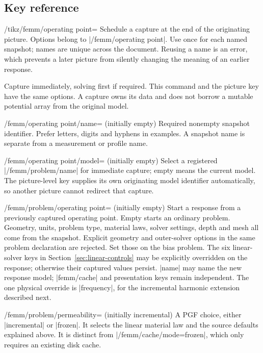 \subsection{Key reference}
\begin{key}{/tikz/femm/operating point=}
Schedule a capture at the end of the originating picture. Options belong to
|/femm/operating point|. Use once for each named snapshot; names are
unique across the document. Reusing a name is an error, which prevents a
later picture from silently changing the meaning of an earlier response.
\end{key}
\begin{command}{\femmoperatingpoint{}}
Capture immediately, solving first if required. This command and the picture
key have the same options. A capture owns its data and does not borrow a
mutable potential array from the original model.
\end{command}
\begin{key}{/femm/operating point/name= (initially empty)}
Required nonempty snapshot identifier. Prefer letters, digits and hyphens in
examples. A snapshot name is separate from a measurement or profile name.
\end{key}
\begin{key}{/femm/operating point/model= (initially empty)}
Select a registered |/femm/problem/name| for immediate capture; empty means
the current model. The picture-level key supplies its own originating model
identifier automatically, so another picture cannot redirect that capture.
\end{key}
\begin{key}{/femm/problem/operating point= (initially empty)}
Start a response from a previously captured operating point. Empty starts an
ordinary problem. Geometry, units, problem type, material laws, solver settings,
depth and mesh all come from the snapshot. Explicit geometry and outer-solver
options in the same problem declaration are rejected. Set those on the bias
problem. The six linear-solver keys in Section~\ref{sec:linear-controls} may be
explicitly overridden on the response; otherwise their captured values persist. |name| may name the new response model;
|femm/cache| and presentation keys remain independent. The one physical override
is |frequency|, for the incremental harmonic extension described next.
\end{key}
\begin{key}{/femm/problem/permeability= (initially incremental)}
A PGF choice, either |incremental| or |frozen|. It selects the linear material
law and the source defaults explained above. It is distinct from
|/femm/cache/mode=frozen|, which only requires an existing disk cache.
\end{key}

